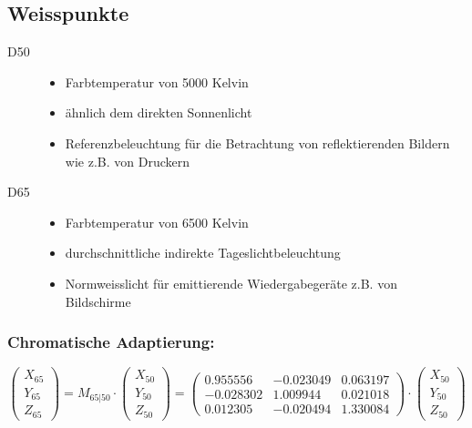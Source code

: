 \documentclass[10pt]{article}
\begin{document}
\subsection{Weisspunkte}
\begin{description}
	\item[D50] \hfill
		\begin{itemize}
			\item Farbtemperatur von 5000 Kelvin
			\item ähnlich dem direkten Sonnenlicht
			\item Referenzbeleuchtung für die Betrachtung von reflektierenden Bildern wie z.B. von Druckern
		\end{itemize}
	\item[D65] \hfill
		\begin{itemize}
			\item Farbtemperatur von 6500 Kelvin
			\item durchschnittliche indirekte Tageslichtbeleuchtung
			\item Normweisslicht für emittierende Wiedergabegeräte z.B. von Bildschirme
		\end{itemize}
\end{description}
\subsubsection*{Chromatische Adaptierung:}
\begin{equation*}
	\begin{pmatrix} X_{65} \\ Y_{65} \\ Z_{65} \end{pmatrix} = 
	M_{65|50} \cdot \begin{pmatrix} X_{50} \\ Y_{50} \\ Z_{50} \end{pmatrix} = 
	\begin{pmatrix} 
	0.955556 & -0.023049 & 0.063197 \\
	 -0.028302 & 1.009944 & 0.021018 \\
	  0.012305 & -0.020494 & 1.330084
	  \end{pmatrix} \cdot \begin{pmatrix} X_{50} \\ Y_{50} \\ Z_{50} \end{pmatrix} 
\end{equation*}
\end{document}
